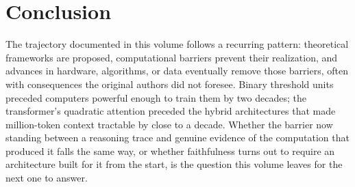 \section*{Conclusion}

The trajectory documented in this volume follows a recurring pattern: theoretical frameworks are proposed, computational barriers prevent their realization, and advances in hardware, algorithms, or data eventually remove those barriers, often with consequences the original authors did not foresee. Binary threshold units preceded computers powerful enough to train them by two decades; the transformer's quadratic attention preceded the hybrid architectures that made million-token context tractable by close to a decade. Whether the barrier now standing between a reasoning trace and genuine evidence of the computation that produced it falls the same way, or whether faithfulness turns out to require an architecture built for it from the start, is the question this volume leaves for the next one to answer.
